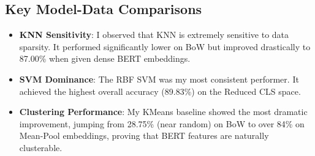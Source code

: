 \documentclass[11pt]{article}
\begin{document}
\begin{table}[H]
\centering
\caption{Comprehensive Accuracy Matrix: Model Performance vs. Data Type}
\label{tab:matrix}
\end{table}

\subsection{Key Model-Data Comparisons}
\begin{itemize}
    \item \textbf{KNN Sensitivity}: I observed that KNN is extremely sensitive to data sparsity. It performed significantly lower on BoW but improved drastically to 87.00\% when given dense BERT embeddings.
    \item \textbf{SVM Dominance}: The RBF SVM was my most consistent performer. It achieved the highest overall accuracy (89.83\%) on the Reduced CLS space.
    \item \textbf{Clustering Performance}: My KMeans baseline showed the most dramatic improvement, jumping from 28.75\% (near random) on BoW to over 84\% on Mean-Pool embeddings, proving that BERT features are naturally clusterable.
\end{itemize}
\end{document}
